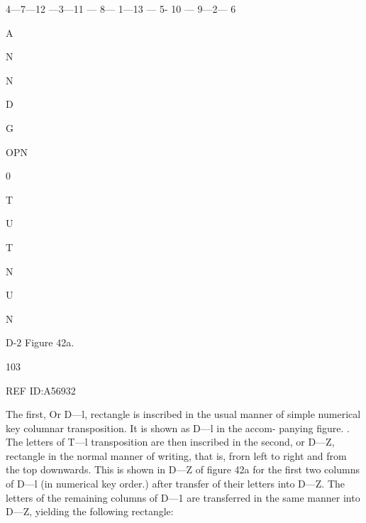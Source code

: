 { 

 

 

 

 

 

 

 

 

4—7—12 —3—11 — 8— 1—13 — 5- 10 — 9—2— 6

 

A

N

N

D

G

OPN

0

T

U

T

N

 

U

N

 

 

 

 

 

 

 

 

 

 

 

 

 

 

 

 

 

 

 

 

 

D-2
Figure 42a.

103

REF ID:A56932

The ﬁrst, Or D—l, rectangle is inscribed in the usual manner of simple
numerical key columnar transposition. It is shown as D—l in the accom-
panying ﬁgure. . The letters of T—l transposition are then inscribed
in the second, or D—Z, rectangle in the normal manner of writing, that
is, frorn left to right and from the top downwards. This is shown in
D—Z of ﬁgure 42a for the ﬁrst two columns of D—l (in numerical key
order.) after transfer of their letters into D—Z. The letters of the
remaining columns of D—1 are transferred in the same manner into
D—Z, yielding the following rectangle:

}
